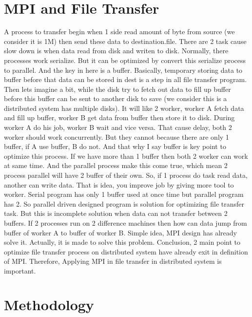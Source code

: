 \documentclass{article}
\begin{document}
\section{MPI and File Transfer}
A process to transfer begin when 1 side read amount of byte from source (we consider it is 1M) then send these data to destination.file.
There are 2 task cause slow down is when data read from disk and writen to disk. Normally, there processes work serialize. But it
can be optimized by convert this serialize process to parallel. And the key in here is a buffer. Basically, temporary storing
data to buffer before that data can be stored in dest is a step in all file transfer program. Then lets imagine a bit, while the disk try to fetch out data to fill up buffer before this buffer can be sent to another disk to save (we consider this is a distributed system has multiple disks). It will like 2 worker, worker A fetch data and fill up buffer, worker B get data from
buffer then store it to disk. During worker A do his job, worker B wait and vice versa. That cause delay, both 2 worker should work
concurrently. But they cannot because there are only 1 buffer, if A use buffer, B do not. And that why I say buffer is key point
to optimize this process. If we have more than 1 buffer then both 2 worker can work at same time.
And the parallel process make this come true, which mean 2 process parallel will have 2 buffer of their own. So, if 1 process do task read data, another can write data. That is idea, you improve job by giving more tool to worker. Serial program has only 1 
buffer used at once time but parallel program has 2. So parallel driven designed program is solution for optimizing file transfer 
task. But this is incomplete solution when data can not transfer between 2 buffers. If 2 processes run on 2 difference machines
then how can data jump from buffer of worker A to buffer of worker B. Simple idea, MPI design has already solve it. Actually, it
is made to solve this problem.
Conclusion, 2 main point to optimize file transfer process on distributed system have already exit in definition of MPI. Therefore,
Applying MPI in file transfer in distributed system is important.

\section{Methodology}
\end{document}
